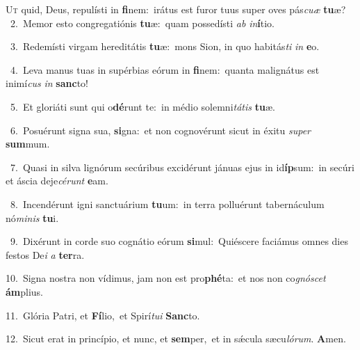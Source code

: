 \lettrine{\initial\textcolor{\initialcolor}{U}}{t} quid, Deus, repulísti in \textbf{fi}\-nem:~\star irátus est furor tuus super oves pás\-\textit{cu}\-\textit{æ} \textbf{tu}\-æ?\\
{\numbfont\textcolor{\numbcolor}{~2.}}~Memor esto congregatiónis \textbf{tu}\-æ:~\star quam possedísti \textit{ab} \textit{in}\-\textbf{í}tio.\par
{\numbfont\textcolor{\numbcolor}{~3.}}~Redemísti virgam hereditátis \textbf{tu}\-æ:~\star mons Sion, in quo habitás\textit{ti} \textit{in} \textbf{e}\-o.\par
{\numbfont\textcolor{\numbcolor}{~4.}}~Leva manus tuas in supérbias eórum in \textbf{fi}\-nem:~\star quanta malignátus est inimí\textit{cus} \textit{in} \textbf{sanc}\-to!\par
{\numbfont\textcolor{\numbcolor}{~5.}}~Et gloriáti sunt qui o\-\textbf{dé}\-runt te:~\star in médio solemni\-\textit{tá}\-\textit{tis} \textbf{tu}\-æ.\par
{\numbfont\textcolor{\numbcolor}{~6.}}~Posuérunt signa sua, \textbf{si}\-gna:~\star et non cognovérunt sicut in éxitu \textit{su}\-\textit{per} \textbf{sum}\-mum.\par
{\numbfont\textcolor{\numbcolor}{~7.}}~Quasi in silva lignórum secúribus excidérunt jánuas ejus in id\-\textbf{íp}\-sum:~\star in secúri et áscia deje\-\textit{cé}\-\textit{runt} \textbf{e}\-am.\par
{\numbfont\textcolor{\numbcolor}{~8.}}~Incendérunt igni sanctuárium \textbf{tu}\-um:~\star in terra polluérunt tabernáculum nó\-\textit{mi}\-\textit{nis} \textbf{tu}\-i.\par
{\numbfont\textcolor{\numbcolor}{~9.}}~Dixérunt in corde suo cognátio eórum \textbf{si}\-mul:~\star Quiéscere faciámus omnes dies festos De\textit{i} \textit{a} \textbf{ter}\-ra.\par
{\numbfont\textcolor{\numbcolor}{10.}}~Signa nostra non vídimus, jam non est pro\-\textbf{phé}\-ta:~\star et nos non co\-\textit{gnó}\-\textit{scet} \textbf{ám}\-plius.\par
{\numbfont\textcolor{\numbcolor}{11.}}~Glória Patri, et \textbf{Fí}\-lio,~\star et Spirí\-\textit{tu}\-\textit{i} \textbf{Sanc}\-to.\par
{\numbfont\textcolor{\numbcolor}{12.}}~Sicut erat in princípio, et nunc, et \textbf{sem}\-per,~\star et in sǽcula sæcu\-\textit{ló}\-\textit{rum}. \textbf{A}\-men.\par
